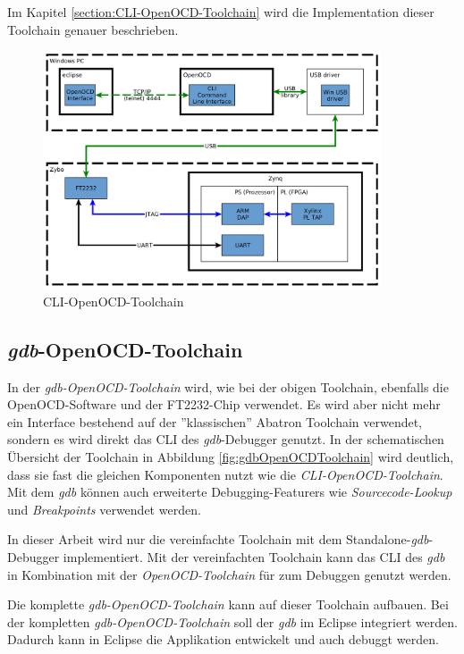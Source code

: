Im Kapitel \ref{section:CLI-OpenOCD-Toolchain} wird die Implementation dieser Toolchain genauer beschrieben.


\begin{figure}[htbp]
	\centering
		\includegraphics[width=10cm,height=\textheight,keepaspectratio]{graphs/CLIOpenOCDToolchain.png}
	\caption{CLI-OpenOCD-Toolchain}
	\label{fig:CLIOpenOCDToolchain}
\end{figure}


\FloatBarrier
\subsection{\textit{gdb}-OpenOCD-Toolchain}
In der \textit{gdb-OpenOCD-Toolchain} wird, wie bei der obigen Toolchain, ebenfalls die OpenOCD-Software und der FT2232-Chip verwendet.
Es wird aber nicht mehr ein Interface bestehend auf der ''klassischen'' Abatron Toolchain verwendet, sondern es wird direkt das CLI des \textit{gdb}-Debugger genutzt.
In der schematischen Übersicht der Toolchain in Abbildung \ref{fig:gdbOpenOCDToolchain} wird deutlich, dass sie fast die gleichen Komponenten nutzt wie die \textit{CLI-OpenOCD-Toolchain}.
Mit dem \textit{gdb} können auch erweiterte Debugging-Featurers wie \textit{Sourcecode-Lookup} und \textit{Breakpoints} verwendet werden.

In dieser Arbeit wird nur die vereinfachte Toolchain mit dem Standalone-\textit{gdb}-Debugger implementiert.
Mit der vereinfachten Toolchain kann das CLI des \textit{gdb} in Kombination mit der \textit{OpenOCD-Toolchain} für zum Debuggen genutzt werden.

Die komplette \textit{gdb-OpenOCD-Toolchain} kann auf dieser Toolchain aufbauen.
Bei der kompletten \textit{gdb-OpenOCD-Toolchain} soll der \textit{gdb} im Eclipse integriert werden.
Dadurch kann in Eclipse die Applikation entwickelt und auch debuggt werden.


